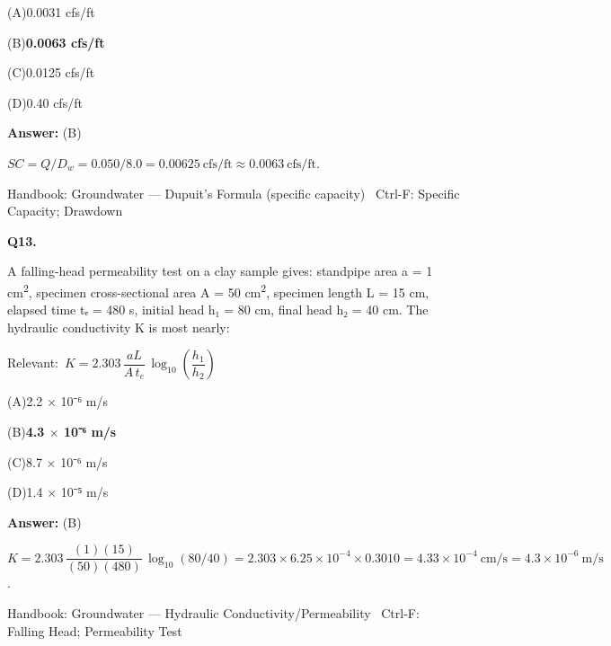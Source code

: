 \documentclass[11pt]{article}
\newcommand{\correct}[1]{\textbf{#1}\;{\color{accent}$\checkmark$}}
\newcommand{\optline}[2]{\par\noindent\hspace{1.2em}(#1)\hspace{0.6em}#2}
\begin{document}
\optline{A}{0.0031 cfs/ft}
\optline{B}{\correct{0.0063 cfs/ft}}
\optline{C}{0.0125 cfs/ft}
\optline{D}{0.40 cfs/ft}
\par\vspace{3pt}
\vspace{2pt}\par\noindent\colorbox{boxbg}{\parbox{\dimexpr\linewidth-2\fboxsep\relax}{%
\vspace{2pt}\textbf{Answer:} (B)\par\vspace{2pt}
{\small $SC = Q/D_w = 0.050/8.0 = 0.00625\ \mathrm{cfs/ft} \approx 0.0063\ \mathrm{cfs/ft}$.}\par\vspace{2pt}
{\footnotesize\color{soft}Handbook: Groundwater --- Dupuit's Formula (specific capacity) \textbullet\ Ctrl-F: Specific Capacity; Drawdown}\vspace{2pt}
}}
\vspace{9pt}
\filbreak
\textbf{\color{accent}Q13.}\par\vspace{2pt}
A falling-head permeability test on a clay sample gives: standpipe area a = 1 cm\textsuperscript{2}, specimen cross-sectional area A = 50 cm\textsuperscript{2}, specimen length L = 15 cm, elapsed time tₑ = 480 s, initial head h₁ = 80 cm, final head h₂ = 40 cm. The hydraulic conductivity K is most nearly:\par\vspace{3pt}
{\small\color{soft}Relevant:}\ $K = 2.303\,\dfrac{aL}{A\,t_e}\,\log_{10}\!\left(\dfrac{h_1}{h_2}\right)$\par\vspace{3pt}
\optline{A}{2.2 $\times$ 10⁻⁶ m/s}
\optline{B}{\correct{4.3 $\times$ 10⁻⁶ m/s}}
\optline{C}{8.7 $\times$ 10⁻⁶ m/s}
\optline{D}{1.4 $\times$ 10⁻⁵ m/s}
\par\vspace{3pt}
\vspace{2pt}\par\noindent\colorbox{boxbg}{\parbox{\dimexpr\linewidth-2\fboxsep\relax}{%
\vspace{2pt}\textbf{Answer:} (B)\par\vspace{2pt}
{\small $K = 2.303\,\dfrac{(1)(15)}{(50)(480)}\,\log_{10}(80/40) = 2.303\times6.25\times10^{-4}\times0.3010 = 4.33\times10^{-4}\ \mathrm{cm/s} = 4.3\times10^{-6}\ \mathrm{m/s}$.}\par\vspace{2pt}
{\footnotesize\color{soft}Handbook: Groundwater --- Hydraulic Conductivity/Permeability \textbullet\ Ctrl-F: Falling Head; Permeability Test}\vspace{2pt}
}}
\end{document}

